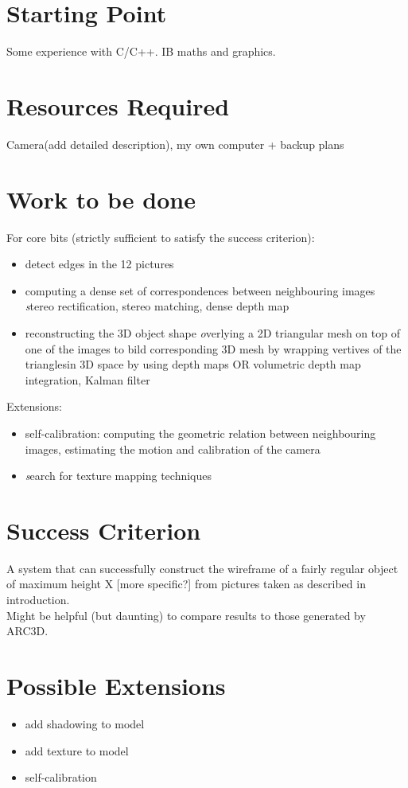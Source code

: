 \section*{Starting Point}
Some experience with C/C++.
IB maths and graphics.

\section*{Resources Required}
Camera(add detailed description), my own computer + backup plans

\section*{Work to be done}
For core bits (strictly sufficient to satisfy the success criterion):
\begin{itemize}
\item detect edges in the 12 pictures
\item computing a dense set of correspondences between neighbouring images
{\emph stereo rectification, stereo matching, dense depth map}
\item reconstructing the 3D object shape
{\emph overlying a 2D triangular mesh on top of one of the images to bild corresponding 3D mesh by wrapping vertives of the trianglesin 3D space by using depth maps OR volumetric depth map integration, Kalman filter}
\end{itemize}
Extensions:
\begin{itemize}
\item self-calibration: computing the geometric relation between neighbouring images, estimating the motion and calibration of the camera
\item {\emph search for texture mapping techniques}
\end{itemize}

\section*{Success Criterion}
 A system that can successfully construct the wireframe of a fairly regular object of maximum height X [more specific?] from pictures taken as described in introduction. \\
 Might be helpful (but daunting) to compare results to those generated by ARC3D.
 
\section*{Possible Extensions}
\begin{itemize}
\item add shadowing to model
\item add texture to model
\item self-calibration
\end{itemize}

